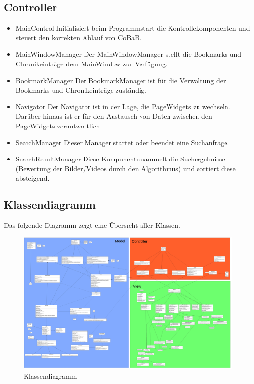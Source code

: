 \subsection*{Controller}
\begin{itemize}
\item MainControl \newline
Initialisiert beim Programmstart die Kontrollekomponenten und steuert den korrekten Ablauf von CoBaB.

\item MainWindowManager \newline
Der MainWindowManager stellt die Bookmarks und Chronikeinträge dem MainWindow zur Verfügung.

\item BookmarkManager \newline
Der BookmarkManager ist für die Verwaltung der Bookmarks und Chronikeinträge zuständig.

\item Navigator \newline
Der Navigator ist in der Lage, die PageWidgets zu wechseln. Darüber hinaus ist er für den Austausch von Daten zwischen den PageWidgets verantwortlich.

\item SearchManager \newline
Dieser Manager startet oder beendet eine Suchanfrage.

\item SearchResultManager \newline
Diese Komponente sammelt die Suchergebnisse (Bewertung der Bilder/Videos durch den Algorithmus) und sortiert diese absteigend.
\end{itemize}
\pagebreak


\subsection{Klassendiagramm}

Das folgende Diagramm zeigt eine Übersicht aller Klassen.

\begin{figure}[H]
	\includegraphics[width=1\linewidth]{img/Klassendiagramm/Complete}
	\caption{Klassendiagramm}
	\label{fig:klassendiagramm}
\end{figure}

